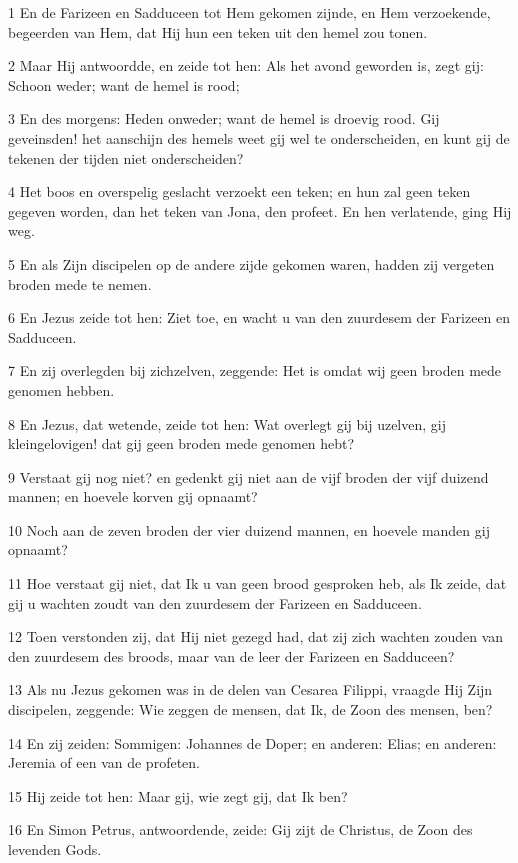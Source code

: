 \par 1 En de Farizeen en Sadduceen tot Hem gekomen zijnde, en Hem verzoekende, begeerden van Hem, dat Hij hun een teken uit den hemel zou tonen.
\par 2 Maar Hij antwoordde, en zeide tot hen: Als het avond geworden is, zegt gij: Schoon weder; want de hemel is rood;
\par 3 En des morgens: Heden onweder; want de hemel is droevig rood. Gij geveinsden! het aanschijn des hemels weet gij wel te onderscheiden, en kunt gij de tekenen der tijden niet onderscheiden?
\par 4 Het boos en overspelig geslacht verzoekt een teken; en hun zal geen teken gegeven worden, dan het teken van Jona, den profeet. En hen verlatende, ging Hij weg.
\par 5 En als Zijn discipelen op de andere zijde gekomen waren, hadden zij vergeten broden mede te nemen.
\par 6 En Jezus zeide tot hen: Ziet toe, en wacht u van den zuurdesem der Farizeen en Sadduceen.
\par 7 En zij overlegden bij zichzelven, zeggende: Het is omdat wij geen broden mede genomen hebben.
\par 8 En Jezus, dat wetende, zeide tot hen: Wat overlegt gij bij uzelven, gij kleingelovigen! dat gij geen broden mede genomen hebt?
\par 9 Verstaat gij nog niet? en gedenkt gij niet aan de vijf broden der vijf duizend mannen; en hoevele korven gij opnaamt?
\par 10 Noch aan de zeven broden der vier duizend mannen, en hoevele manden gij opnaamt?
\par 11 Hoe verstaat gij niet, dat Ik u van geen brood gesproken heb, als Ik zeide, dat gij u wachten zoudt van den zuurdesem der Farizeen en Sadduceen.
\par 12 Toen verstonden zij, dat Hij niet gezegd had, dat zij zich wachten zouden van den zuurdesem des broods, maar van de leer der Farizeen en Sadduceen?
\par 13 Als nu Jezus gekomen was in de delen van Cesarea Filippi, vraagde Hij Zijn discipelen, zeggende: Wie zeggen de mensen, dat Ik, de Zoon des mensen, ben?
\par 14 En zij zeiden: Sommigen: Johannes de Doper; en anderen: Elias; en anderen: Jeremia of een van de profeten.
\par 15 Hij zeide tot hen: Maar gij, wie zegt gij, dat Ik ben?
\par 16 En Simon Petrus, antwoordende, zeide: Gij zijt de Christus, de Zoon des levenden Gods.
